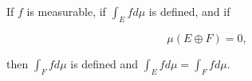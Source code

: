 If $f$ is measurable, if $\int_E fd\mu$ is defined, and if

$$\mu(E \oplus F) = 0,$$

then $\int_F fd\mu$ is defined and $\int_E fd\mu = \int_F fd\mu.$
